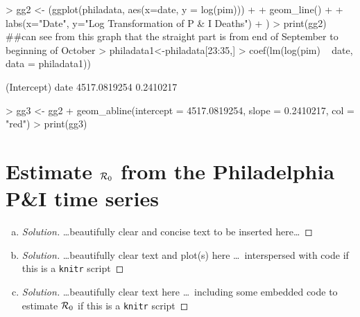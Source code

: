 \documentclass[12pt]{article}
\begin{document}
\begin{enumerate}[(a)]
\begin{Schunk}
\begin{Sinput}
> gg2 <- (ggplot(philadata, aes(x=date, y = log(pim))) + 
+           geom_line() + 
+           labs(x="Date", y="Log Transformation of P & I Deaths")
+ )
> print(gg2) ##can see from this graph that the straight part is from end of September to beginning of October
> philadata1<-philadata[23:35,]
> coef(lm(log(pim) ~ date, data = philadata1))
\end{Sinput}
\begin{Soutput}
 (Intercept)         date 
4517.0819254    0.2410217 
\end{Soutput}
\begin{Sinput}
> gg3 <- gg2 + geom_abline(intercept = 4517.0819254, slope = 0.2410217, col = "red")
> print(gg3)
\end{Sinput}
\end{Schunk}


\PhilaDataReproduceB

\end{enumerate}

\section{Estimate ${\cal R}_0$ from the Philadelphia P\&I time series}

\begin{enumerate}[(a)]

\item \EstimateRna

 {\color{blue} \begin{proof}[Solution]
 {\color{magenta}\dots beautifully clear and concise text to be inserted here\dots}
 \end{proof}
 }

\item \EstimateRnb

  {\color{blue} \begin{proof}[Solution]
  {\color{magenta}\dots beautifully clear text and plot(s) here \dots\ interspersed with \Rlogo code if this is a \texttt{knitr} script}
  \end{proof}
  }
  
\item \EstimateRnc

  {\color{blue} \begin{proof}[Solution]
  {\color{magenta}\dots beautifully clear text here \dots\ including some embedded \Rlogo code to estimate ${\cal R}_0$ if this is a \texttt{knitr} script}
  \end{proof}
  }

\end{enumerate}
\end{document}
